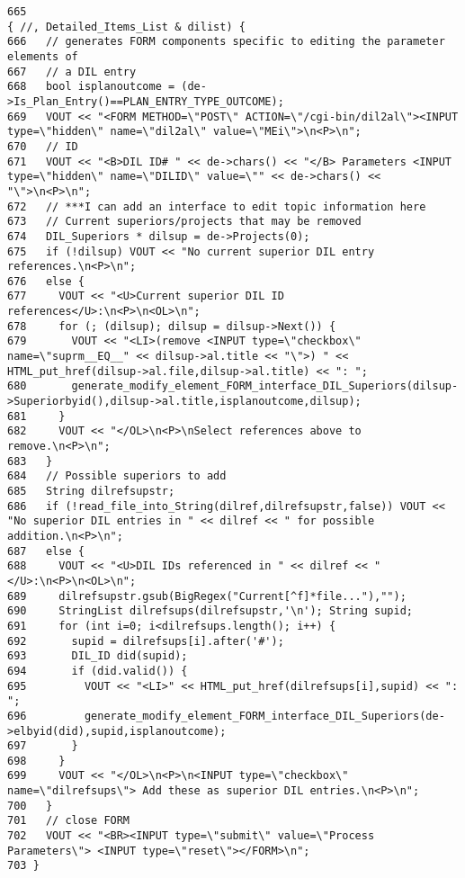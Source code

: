 \footnotesize\begin{verbatim}665                                                                                  { //, Detailed_Items_List & dilist) {
666   // generates FORM components specific to editing the parameter elements of
667   // a DIL entry
668   bool isplanoutcome = (de->Is_Plan_Entry()==PLAN_ENTRY_TYPE_OUTCOME);
669   VOUT << "<FORM METHOD=\"POST\" ACTION=\"/cgi-bin/dil2al\"><INPUT type=\"hidden\" name=\"dil2al\" value=\"MEi\">\n<P>\n";
670   // ID
671   VOUT << "<B>DIL ID# " << de->chars() << "</B> Parameters <INPUT type=\"hidden\" name=\"DILID\" value=\"" << de->chars() << "\">\n<P>\n";
672   // ***I can add an interface to edit topic information here
673   // Current superiors/projects that may be removed
674   DIL_Superiors * dilsup = de->Projects(0);
675   if (!dilsup) VOUT << "No current superior DIL entry references.\n<P>\n";
676   else {
677     VOUT << "<U>Current superior DIL ID references</U>:\n<P>\n<OL>\n";
678     for (; (dilsup); dilsup = dilsup->Next()) {
679       VOUT << "<LI>(remove <INPUT type=\"checkbox\" name=\"suprm__EQ__" << dilsup->al.title << "\">) " << HTML_put_href(dilsup->al.file,dilsup->al.title) << ": ";
680       generate_modify_element_FORM_interface_DIL_Superiors(dilsup->Superiorbyid(),dilsup->al.title,isplanoutcome,dilsup);
681     }
682     VOUT << "</OL>\n<P>\nSelect references above to remove.\n<P>\n";
683   }
684   // Possible superiors to add
685   String dilrefsupstr;
686   if (!read_file_into_String(dilref,dilrefsupstr,false)) VOUT << "No superior DIL entries in " << dilref << " for possible addition.\n<P>\n";
687   else {
688     VOUT << "<U>DIL IDs referenced in " << dilref << "</U>:\n<P>\n<OL>\n";
689     dilrefsupstr.gsub(BigRegex("Current[^f]*file..."),"");
690     StringList dilrefsups(dilrefsupstr,'\n'); String supid;
691     for (int i=0; i<dilrefsups.length(); i++) {
692       supid = dilrefsups[i].after('#');
693       DIL_ID did(supid);
694       if (did.valid()) {
695         VOUT << "<LI>" << HTML_put_href(dilrefsups[i],supid) << ": ";
696         generate_modify_element_FORM_interface_DIL_Superiors(de->elbyid(did),supid,isplanoutcome);
697       }
698     }
699     VOUT << "</OL>\n<P>\n<INPUT type=\"checkbox\" name=\"dilrefsups\"> Add these as superior DIL entries.\n<P>\n";
700   }
701   // close FORM
702   VOUT << "<BR><INPUT type=\"submit\" value=\"Process Parameters\"> <INPUT type=\"reset\"></FORM>\n";
703 }
\end{verbatim}\normalsize 
{}
